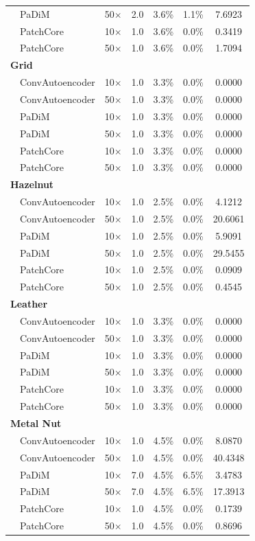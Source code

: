 \begin{table}[t]
\begin{tabular}{llccccc}
 & PaDiM & 50$\times$ & 2.0 & 3.6\% & 1.1\% & 7.6923 \\
 & PatchCore & 10$\times$ & 1.0 & 3.6\% & 0.0\% & 0.3419 \\
 & PatchCore & 50$\times$ & 1.0 & 3.6\% & 0.0\% & 1.7094 \\
\midrule
\multicolumn{7}{l}{\textbf{Grid}} \\
 & ConvAutoencoder & 10$\times$ & 1.0 & 3.3\% & 0.0\% & 0.0000 \\
 & ConvAutoencoder & 50$\times$ & 1.0 & 3.3\% & 0.0\% & 0.0000 \\
 & PaDiM & 10$\times$ & 1.0 & 3.3\% & 0.0\% & 0.0000 \\
 & PaDiM & 50$\times$ & 1.0 & 3.3\% & 0.0\% & 0.0000 \\
 & PatchCore & 10$\times$ & 1.0 & 3.3\% & 0.0\% & 0.0000 \\
 & PatchCore & 50$\times$ & 1.0 & 3.3\% & 0.0\% & 0.0000 \\
\midrule
\multicolumn{7}{l}{\textbf{Hazelnut}} \\
 & ConvAutoencoder & 10$\times$ & 1.0 & 2.5\% & 0.0\% & 4.1212 \\
 & ConvAutoencoder & 50$\times$ & 1.0 & 2.5\% & 0.0\% & 20.6061 \\
 & PaDiM & 10$\times$ & 1.0 & 2.5\% & 0.0\% & 5.9091 \\
 & PaDiM & 50$\times$ & 1.0 & 2.5\% & 0.0\% & 29.5455 \\
 & PatchCore & 10$\times$ & 1.0 & 2.5\% & 0.0\% & 0.0909 \\
 & PatchCore & 50$\times$ & 1.0 & 2.5\% & 0.0\% & 0.4545 \\
\midrule
\multicolumn{7}{l}{\textbf{Leather}} \\
 & ConvAutoencoder & 10$\times$ & 1.0 & 3.3\% & 0.0\% & 0.0000 \\
 & ConvAutoencoder & 50$\times$ & 1.0 & 3.3\% & 0.0\% & 0.0000 \\
 & PaDiM & 10$\times$ & 1.0 & 3.3\% & 0.0\% & 0.0000 \\
 & PaDiM & 50$\times$ & 1.0 & 3.3\% & 0.0\% & 0.0000 \\
 & PatchCore & 10$\times$ & 1.0 & 3.3\% & 0.0\% & 0.0000 \\
 & PatchCore & 50$\times$ & 1.0 & 3.3\% & 0.0\% & 0.0000 \\
\midrule
\multicolumn{7}{l}{\textbf{Metal Nut}} \\
 & ConvAutoencoder & 10$\times$ & 1.0 & 4.5\% & 0.0\% & 8.0870 \\
 & ConvAutoencoder & 50$\times$ & 1.0 & 4.5\% & 0.0\% & 40.4348 \\
 & PaDiM & 10$\times$ & 7.0 & 4.5\% & 6.5\% & 3.4783 \\
 & PaDiM & 50$\times$ & 7.0 & 4.5\% & 6.5\% & 17.3913 \\
 & PatchCore & 10$\times$ & 1.0 & 4.5\% & 0.0\% & 0.1739 \\
 & PatchCore & 50$\times$ & 1.0 & 4.5\% & 0.0\% & 0.8696 \\
\bottomrule
\end{tabular}
\end{table}
